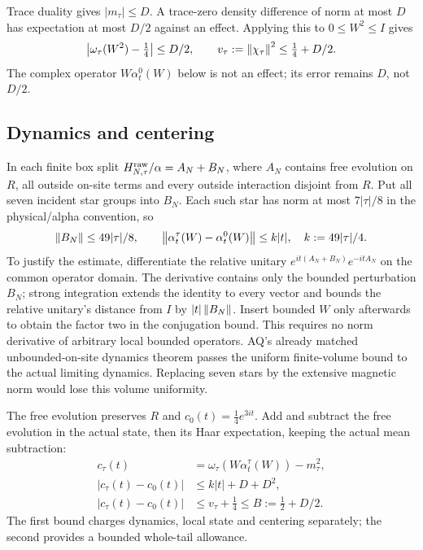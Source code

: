 Trace duality gives $|m_\tau|\le D$. A trace-zero density difference of norm at
most $D$ has expectation at most $D/2$ against an effect. Applying this to
$0\le W^2\le I$ gives
\begin{equation}
 \left\lvert\omega_\tau(W^2)-\tfrac14\right\rvert\le D/2,
 \qquad v_\tau:=\left\lVert\chi_\tau\right\rVert^2\le\tfrac14+D/2.
 \label{eq:effect}
\end{equation}
The complex operator $W\alpha_t^0(W)$ below is not an effect; its error remains
$D$, not $D/2$.

\subsection{Dynamics and centering}
In each finite box split $H_{N,\tau}^{\rm raw}/\alpha=A_N+B_N$, where $A_N$
contains free evolution on $R$, all outside on-site terms and every outside
interaction disjoint from $R$. Put all seven incident star groups into $B_N$.
Each such star has norm at most $7|\tau|/8$ in the physical/alpha convention, so
\begin{equation}
 \left\lVert B_N\right\rVert\le49|\tau|/8,\qquad
 \left\lVert\alpha_t^\tau(W)-\alpha_t^0(W)\right\rVert
 \le k|t|,\quad k:=49|\tau|/4.
 \label{eq:duhamel}
\end{equation}
To justify the estimate, differentiate the relative unitary
$e^{it(A_N+B_N)}e^{-itA_N}$ on the common operator domain. The derivative
contains only the bounded perturbation $B_N$; strong integration extends the
identity to every vector and bounds the relative unitary's distance from $I$
by $|t|\left\lVert B_N\right\rVert$. Insert bounded $W$ only afterwards to obtain the factor two
in the conjugation bound. This requires no norm derivative of arbitrary local
bounded operators. AQ's already matched unbounded-on-site dynamics theorem
\cite{ns,aq} passes the uniform finite-volume bound to the actual limiting
dynamics. Replacing seven stars by the extensive magnetic norm would lose this
volume uniformity.

The free evolution preserves $R$ and
$c_0(t)=\tfrac14e^{3it}$. Add and subtract the free evolution in the actual
state, then its Haar expectation, keeping the actual mean subtraction:
\begin{align}
 c_\tau(t)&=\omega_\tau(W\alpha_t^\tau(W))-m_\tau^2,\\
 |c_\tau(t)-c_0(t)|&\le k|t|+D+D^2,
 \label{eq:rawcompare}\\
 |c_\tau(t)-c_0(t)|&\le v_\tau+\tfrac14\le B:=\tfrac12+D/2.
 \label{eq:tailbound}
\end{align}
The first bound charges dynamics, local state and centering separately; the
second provides a bounded whole-tail allowance.

